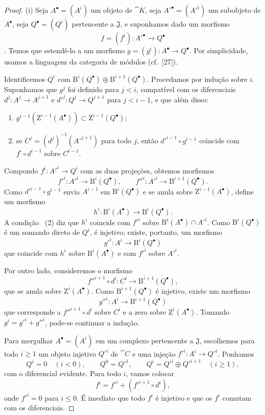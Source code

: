 \begin{proof}
{\rm(i)}
Seja $A^\bullet=(A^i)$ um objeto de $\cat{K}$, seja $A'^\bullet=(A'^i)$ um subobjeto de $A^\bullet$, seja $Q^\bullet=(Q^i)$ pertencente a $\mathfrak{J}$, e suponhamos dado um morfismo
\[
  f=(f^i):A'^\bullet\longrightarrow Q^\bullet
\]
.
Temos que estendê-lo a um morfismo $g=(g^i):A^\bullet\to Q^\bullet$.
Por simplicidade, usamos a linguagem da categoria de módulos (cf.~[27]).

Identificemos $Q^i$ com $\mathrm{B}^i(Q^\bullet)\oplus\mathrm{B}^{i+1}(Q^\bullet)$.
Procedamos por indução sobre $i$.
Suponhamos que $g^j$ foi definido para $j<i$, compatível com os diferenciais $d^j:A^j\to A^{j+1}$ e $d'^j:Q^j\to Q^{j+1}$ para $j<i-1$, e que além disso:
\begin{enumerate}
  \item[{\rm(1)}] $g^{i-1}(\mathrm{Z}^{i-1}(A^\bullet))\subset\mathrm{Z}^{i-1}(Q^\bullet)$;
  \item[{\rm(2) }] se $C^j=(d^j)^{-1}(A'^{j+1})$ para todo $j$, então $d'^{i-1}\circ g^{i-1}$ coincide com $f^i\circ d^{i-1}$ sobre $C^{i-1}$.
\end{enumerate}
Compondo $f^i:A'^i\to Q^i$ com as duas projeções, obtemos morfismos
\[
  f'^i:A'^i\longrightarrow\mathrm{B}^i(Q^\bullet),
  \qquad
  f''^i:A'^i\longrightarrow\mathrm{B}^{i+1}(Q^\bullet).
\]
Como $d'^{i-1}\circ g^{i-1}$ envia $A^{i-1}$ em $\mathrm{B}^i(Q^\bullet)$ e se anula sobre $\mathrm{Z}^{i-1}(A^\bullet)$, define um morfismo
\[
  h^i:\mathrm{B}^i(A^\bullet)\longrightarrow\mathrm{B}^i(Q^\bullet).
\]
A condição ~{\rm(2)} diz que $h^i$ coincide com $f'^i$ sobre $\mathrm{B}^i(A^\bullet)\cap A'^i$.
Como $\mathrm{B}^i(Q^\bullet)$ é um somando direto de $Q^i$, é injetivo; existe, portanto, um morfismo
\[
  g'^i:A^i\longrightarrow\mathrm{B}^i(Q^\bullet)
\]
que coincide com $h^i$ sobre $\mathrm{B}^i(A^\bullet)$ e com $f'^i$ sobre $A'^i$.

Por outro lado, consideremos o morfismo
\[
  f''^{i+1}\circ d^i:C^i\longrightarrow\mathrm{B}^{i+1}(Q^\bullet),
\]
que se anula sobre $\mathrm{Z}^i(A^\bullet)$.
Como $\mathrm{B}^{i+1}(Q^\bullet)$ é injetivo, existe um morfismo
\[
  g''^i:A^i\longrightarrow\mathrm{B}^{i+1}(Q^\bullet)
\]
que corresponde a $f''^{i+1}\circ d^i$ sobre $C^i$ e a zero sobre $\mathrm{Z}^i(A^\bullet)$.
Tomando $g^i=g'^i+g''^i$, pode-se continuar a indução.

\smallskip
{}
Para mergulhar $A^\bullet=(A^i)$ em um complexo pertencente a $\mathfrak{J}$, escolhemos para todo $i\geq1$ um objeto injetivo $Q'^i$ de $\cat{C}$ e uma injeção $f'^i:A^i\to Q'^i$.
Ponhamos
\[
  Q^i=0\quad(i<0),\qquad Q^0=Q'^1,\qquad
  Q^i=Q'^i\oplus Q'^{i+1}\quad(i\geq1),
\]
com o diferencial evidente.
Para todo $i$, vamos colocar
\[
  f^i=f'^i+(f'^{i+1}\circ d^i),
\]
onde $f'^i=0$ para $i\leq0$.
É imediato que todo $f^i$ é injetivo e que os $f^i$ comutam com os diferenciais.
\end{proof}

